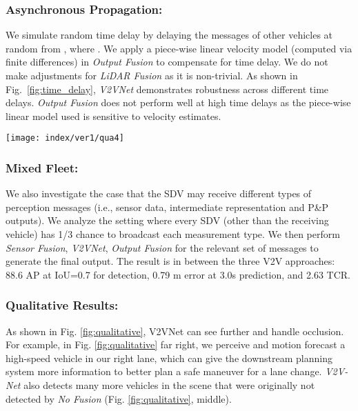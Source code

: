 \documentclass[runningheads]{llncs}
\newcommand{\pnp}{P\&P}
\newcommand{\figref}{Fig.~\ref}
\begin{document}
\subsubsection{Asynchronous Propagation:}
We simulate random time delay by delaying the messages of other vehicles at random from , where . 
We apply a piece-wise linear velocity model (computed via finite differences) in \textit{Output Fusion} to compensate for time delay.
We do not make adjustments for \textit{LiDAR Fusion} as it is non-trivial. As shown in \figref{fig:time_delay},
\textit{V2VNet} demonstrates 
robustness across different time delays.
\textit{Output Fusion} does not perform well 
at high time delays as the piece-wise linear model used
is 
sensitive to 
velocity estimates.

\begin{figure*}[t]
  \centering
  \texttt{[image: index/ver1/qua4]}
\caption{V2V-Net Qualitative Examples. Left: Occluded car detected; Middle:
Perception range increased; Right: Fast car detected.}
  \label{fig:qualitative}
\end{figure*}

\subsubsection{Mixed Fleet:}
We also investigate the case 
that the SDV
may receive different types of perception messages  (i.e., sensor data, intermediate representation and \pnp{} outputs). 
We analyze the setting where every SDV (other than the receiving vehicle) has 
1/3 chance to broadcast each measurement type.
We then perform \textit{Sensor Fusion}, \textit{V2VNet}, \textit{Output Fusion} for the relevant set of messages to generate the final 
output.  
The result is in between the 
three V2V
approaches: 
88.6 AP at IoU=0.7 for detection, 0.79 m error at 3.0s prediction, and 2.63 TCR.

\subsubsection{Qualitative Results:} As shown in Fig. \ref{fig:qualitative}, V2VNet can see 
further
and handle occlusion. 
For example, in Fig. \ref{fig:qualitative} far right, we perceive and motion forecast a high-speed vehicle in our right lane, which can give the downstream planning system more information to better plan a safe maneuver for a lane change. 
\textit{V2V-Net} also detects many more vehicles in the scene that were originally not detected by \textit{No Fusion} (Fig. \ref{fig:qualitative}, middle).
\end{document}
